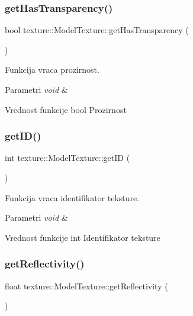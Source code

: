 \subsubsection{\texorpdfstring{get\+Has\+Transparency()}{getHasTransparency()}}
{\footnotesize\ttfamily bool texture\+::\+Model\+Texture\+::get\+Has\+Transparency (\begin{DoxyParamCaption}{ }\end{DoxyParamCaption})}



Funkcija vraca prozirnost. 


\begin{DoxyParams}{Parametri}
{\em void} & \\
\hline
\end{DoxyParams}
\begin{DoxyReturn}{Vrednost funkcije}
bool Prozirnost 
\end{DoxyReturn}
\mbox{\label{classtexture_1_1ModelTexture_a3eeda8235d9c4cfccccc2ac805eeb864}} 
\subsubsection{\texorpdfstring{get\+I\+D()}{getID()}}
{\footnotesize\ttfamily int texture\+::\+Model\+Texture\+::get\+ID (\begin{DoxyParamCaption}{ }\end{DoxyParamCaption})}



Funkcija vraca identifikator teksture. 


\begin{DoxyParams}{Parametri}
{\em void} & \\
\hline
\end{DoxyParams}
\begin{DoxyReturn}{Vrednost funkcije}
int Identifikator teksture 
\end{DoxyReturn}
\mbox{\label{classtexture_1_1ModelTexture_a613024c969ec176a1add0c20c3f98969}} 
\subsubsection{\texorpdfstring{get\+Reflectivity()}{getReflectivity()}}
{\footnotesize\ttfamily float texture\+::\+Model\+Texture\+::get\+Reflectivity (\begin{DoxyParamCaption}{ }\end{DoxyParamCaption})}



